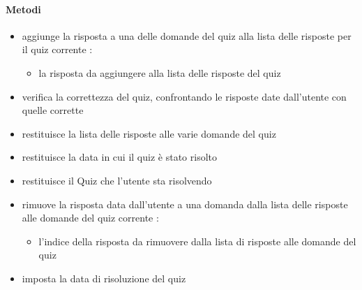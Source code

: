 \paragraph{Metodi}
\begin{itemize}
\item {}
\newline
aggiunge la risposta a una delle domande del quiz alla lista delle risposte per il quiz corrente
\newline
{} :
\begin{itemize}
\item {}
\newline
la risposta da aggiungere alla lista delle risposte del quiz
\end{itemize}
\item {}
\newline
verifica la correttezza del quiz, confrontando le risposte date dall'utente con quelle corrette
\newline
\item {}
\newline
restituisce la lista delle risposte alle varie domande del quiz
\newline
\item {}
\newline
restituisce la data in cui il quiz è stato risolto
\newline
\item {}
\newline
restituisce il Quiz che l'utente sta risolvendo
\newline
\item {}
\newline
rimuove la risposta data dall'utente a una domanda dalla lista delle risposte alle domande del quiz corrente
\newline
{} :
\begin{itemize}
\item {}
\newline
l'indice della risposta da rimuovere dalla lista di risposte alle domande del quiz
\end{itemize}
\item {}
\newline
imposta la data di risoluzione del quiz

\end{itemize}

